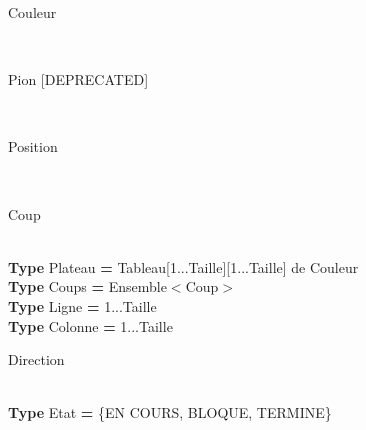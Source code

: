 \begin{algorithme}

	\begin{enregistrement}{Couleur}
	\end{enregistrement}
\\
	\begin{enregistrement}{Pion [DEPRECATED]}
	\end{enregistrement}
\\
	\begin{enregistrement}{Position}
	\end{enregistrement}
\\

	\begin{enregistrement}{Coup}
	\end{enregistrement}
\\
	\textbf{Type} Plateau \textbf{=} Tableau[1...Taille][1...Taille] de Couleur
\\
	\textbf{Type} Coups \textbf{=} Ensemble$<$Coup$>$
\\
	\textbf{Type} Ligne \textbf{=} 1...Taille
\\
	\textbf{Type} Colonne \textbf{=} 1...Taille
\\
	\begin{enregistrement}{Direction}
	\end{enregistrement}
\\
	\textbf{Type} Etat \textbf{=} {\{EN COURS, BLOQUE, TERMINE\}}


\end{algorithme}
